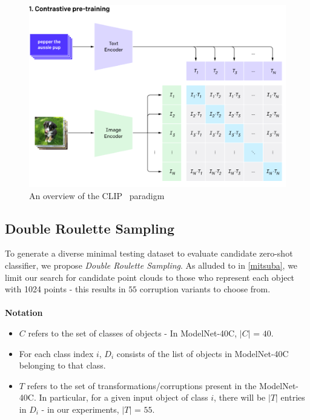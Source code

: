 \documentclass[letterpaper, 10 pt, conference]{ieeeconf}  %
\begin{document}
\begin{figure}[thpb]
    \centering
    \includegraphics[scale=0.225]{clipv2.png}
    \caption{An overview of the CLIP~\cite{radford2021learning} paradigm}
    \label{clip:arch}
    \vspace{-4mm}
\end{figure} 

\subsection{Double Roulette Sampling}
\label{zero-shot:doubleroulette}
To generate a diverse minimal testing dataset to evaluate candidate zero-shot classifier, we propose \textit{Double Roulette Sampling}. As alluded to in \ref{mitsuba}, we limit our search for candidate point clouds to those who represent each object with 1024 points - this results in $55$ corruption variants to choose from. \\ \\
\textbf{Notation}
\begin{itemize}
    \item $C$ refers to the set of classes of objects - In ModelNet-40C, $|C|$ = $40$.
    \item For each class index $i$, $D_{i}$ consists of the list of objects in ModelNet-40C belonging to that class.
    \item $T$ refers to the set of transformations/corruptions present in the ModelNet-40C. In particular, for a given input object of class $i$, there will be $|T|$ entries in $D_{i}$ - in our experiments, $|T|$ = $55$. 
\end{itemize}
\end{document}

